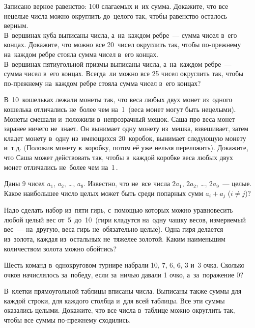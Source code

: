\begin{exercises}

\item
\subproblem
Записано верное равенство: 100 слагаемых и~их сумма.
Докажите, что все нецелые числа можно округлить до~целого так, чтобы равенство
осталось верным.
\\
\subproblem
В~вершинах куба выписаны числа, а~на~каждом ребре~--- сумма чисел в~его концах.
Докажите, что можно все 20~чисел округлить так, чтобы по-прежнему на~каждом
ребре стояла сумма чисел в~его концах.
\\
\subproblem
В~вершинах пятиугольной призмы выписаны числа, а~на~каждом ребре~--- сумма
чисел в~его концах.
Всегда~ли можно все 25 чисел округлить так, чтобы по-прежнему на~каждом ребре
стояла сумма чисел в~его концах?

\item
В~10~кошельках лежали монеты так, что веса любых двух монет из~одного кошелька
отличались не~более чем на~1\, (веса монет могут быть нецелыми).
Монеты смешали и~положили в~непрозрачный мешок.
Саша про веса монет заранее ничего не~знает.
Он вынимает одну монету из~мешка, взвешивает, затем кладет монету в~одну
из~имеющихся 20~коробок, вынимает следующую монету и~т.д.
(Положив монету в~коробку, потом её уже нельзя переложить).
Докажите, что Саша может действовать так, чтобы в~каждой коробке веса любых
двух монет отличались не~более чем на~1\,.

\item
Даны $9$ чисел $a_{1}$, $a_{2}$, \ldots, $a_{9}$.
Известно, что не~все числа $2 a_{1}$, $2 a_{2}$, \ldots, $2 a_{9}$~--- целые.
Какое наибольшее число целых может быть среди попарных сумм $a_{i} + a_{j}$
($i \neq j$)?

\item
Надо сделать набор из~пяти гирь, с~помощью которых можно уравновесить любой
целый вес от~5\, до~10\,
(гири кладутся на~одну чашку весов, измеряемый вес~--- на~другую, веса гирь
не~обязательно целые).
Одна гиря делается из~золота, каждая из~остальных не~тяжелее золотой.
Каким наименьшим количеством золота можно обойтись?

\item
Шесть команд в~однокруговом турнире набрали 10, 7, 6, 6, 3 и~3 очка.
Сколько очков начислялось за~победу, если за~ничью давали 1 очко,
а~за~поражение 0?

\item
В~клетки прямоугольной таблицы вписаны числа.
Выписаны также суммы для каждой строки, для каждого столбца и~для всей таблицы.
Все эти суммы оказались целыми.
Докажите, что все числа в~таблице можно округлить так, чтобы все суммы
по-прежнему сходились.

\end{exercises}

